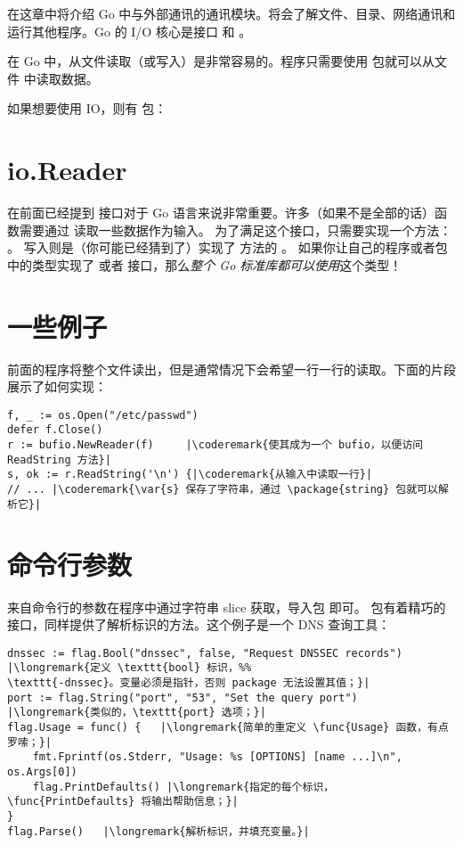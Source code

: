 \noindent{}在这章中将介绍 Go 中与外部通讯的通讯模块。将会了解文件、目录、网络通讯和运行其他程序。Go 的 I/O 核心是接口  和 。

在 Go 中，从文件读取（或写入）是非常容易的。程序只需要使用
 包就可以从文件  中读取数据。

\showremarks
如果想要使用 IO，则有
 包：

\showremarks

\section{io.Reader}
在前面已经提到  接口对于 Go 语言来说非常重要。许多（如果不是全部的话）函数需要通过 
 读取一些数据作为输入。
为了满足这个接口，只需要实现一个方法：
。
写入则是（你可能已经猜到了）实现了  方法的 。
如果你让自己的程序或者包中的类型实现了  或者
 接口，那么\emph{整个 Go 标准库都可以使用}这个类型！

\section{一些例子}

前面的程序将整个文件读出，但是通常情况下会希望一行一行的读取。下面的片段展示了如何实现：

\begin{lstlisting}
f, _ := os.Open("/etc/passwd")
defer f.Close()
r := bufio.NewReader(f)     |\coderemark{使其成为一个 bufio，以便访问 ReadString 方法}|
s, ok := r.ReadString('\n') {|\coderemark{从输入中读取一行}|
// ... |\coderemark{\var{s} 保存了字符串，通过 \package{string} 包就可以解析它}|
\end{lstlisting}

\section{命令行参数}
\label{sec:option parsing}
来自命令行的参数在程序中通过字符串 slice  获取，导入包  即可。
 包有着精巧的接口，同样提供了解析标识的方法。这个例子是一个 DNS 查询工具：
\begin{lstlisting}
dnssec := flag.Bool("dnssec", false, "Request DNSSEC records") |\longremark{定义 \texttt{bool} 标识，%%
\texttt{-dnssec}。变量必须是指针，否则 package 无法设置其值；}|
port := flag.String("port", "53", "Set the query port")      |\longremark{类似的，\texttt{port} 选项；}|
flag.Usage = func() {   |\longremark{简单的重定义 \func{Usage} 函数，有点罗嗦；}|
    fmt.Fprintf(os.Stderr, "Usage: %s [OPTIONS] [name ...]\n", os.Args[0])
    flag.PrintDefaults() |\longremark{指定的每个标识，\func{PrintDefaults} 将输出帮助信息；}|
}
flag.Parse()   |\longremark{解析标识，并填充变量。}|
\end{lstlisting}
\showremarks

